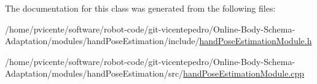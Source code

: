 The documentation for this class was generated from the following files\+:\begin{DoxyCompactItemize}
\item 
/home/pvicente/software/robot-\/code/git-\/vicentepedro/\+Online-\/\+Body-\/\+Schema-\/\+Adaptation/modules/hand\+Pose\+Estimation/include/\hyperlink{handPoseEstimationModule_8h}{hand\+Pose\+Estimation\+Module.\+h}\item 
/home/pvicente/software/robot-\/code/git-\/vicentepedro/\+Online-\/\+Body-\/\+Schema-\/\+Adaptation/modules/hand\+Pose\+Estimation/src/\hyperlink{handPoseEstimationModule_8cpp}{hand\+Pose\+Estimation\+Module.\+cpp}\end{DoxyCompactItemize}
